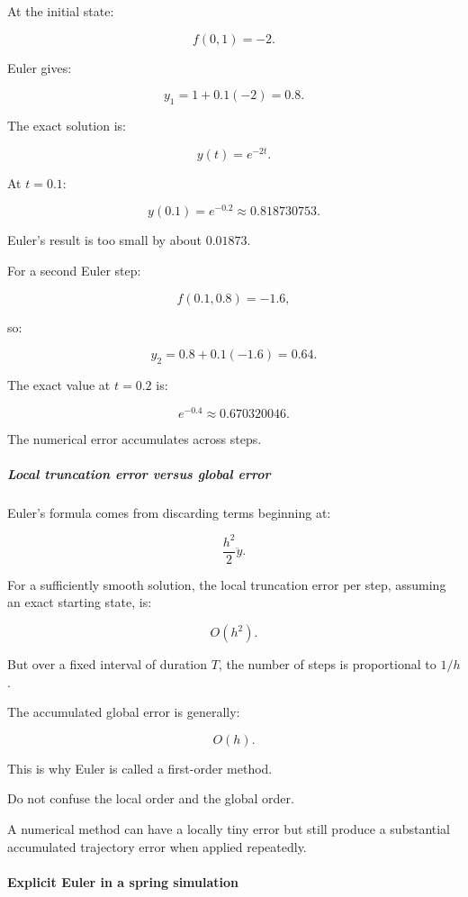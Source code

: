At the initial state:

\[
f(0,1)=-2.
\]

Euler gives:

\[
y_1=1+0.1(-2)=\boxed{0.8}.
\]

The exact solution is:

\[
y(t)=e^{-2t}.
\]

At \(t=0.1\):

\[
y(0.1)=e^{-0.2}\approx0.818730753.
\]

Euler's result is too small by about \(0.01873\).

For a second Euler step:

\[
f(0.1,0.8)=-1.6,
\]

so:

\[
y_2=0.8+0.1(-1.6)=0.64.
\]

The exact value at \(t=0.2\) is:

\[
e^{-0.4}\approx0.670320046.
\]

The numerical error accumulates across steps.

\subparagraph{Local truncation error versus global error}\label{02-foundations-ii-ch025-local-truncation-error-versus-global-error}

\hypertarget{02-foundations-ii-ch025-local-truncation-error-versus-global-error}{}

Euler's formula comes from discarding terms beginning at:

\[
\frac{h^2}{2}\ddot y.
\]

For a sufficiently smooth solution, the local truncation error per step, assuming an exact starting state, is:

\[
O(h^2).
\]

But over a fixed interval of duration \(T\), the number of steps is proportional to \(1/h\).

The accumulated global error is generally:

\[
\boxed{O(h)}.
\]

This is why Euler is called a first-order method.

Do not confuse the local order and the global order.

A numerical method can have a locally tiny error but still produce a substantial accumulated trajectory error when applied repeatedly.

\paragraph{Explicit Euler in a spring simulation}\label{02-foundations-ii-ch025-explicit-euler-in-a-spring-simulation}

